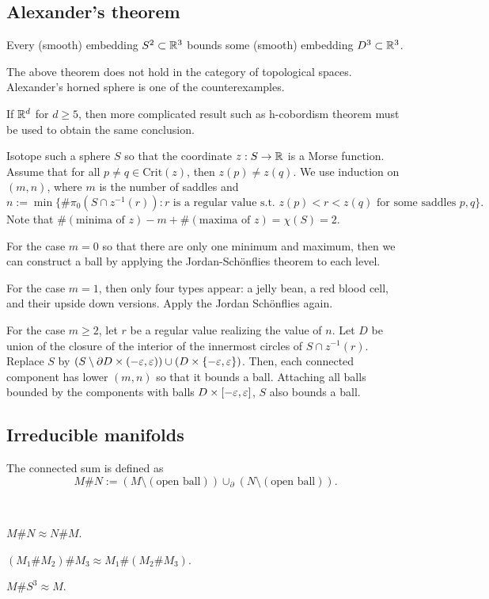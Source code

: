 \documentclass{../../small}
\begin{document}
\subsection{Alexander's theorem}
\begin{thm}
Every (smooth) embedding $S^2\subset\mathbb{R}^3$ bounds some (smooth) embedding $D^3\subset\mathbb{R}^3$.
\end{thm}
\begin{rmk*}
The above theorem does not hold in the category of topological spaces.
Alexander's horned sphere is one of the counterexamples.

If $\mathbb{R}^d$ for $d\ge5$, then more complicated result such as h-cobordism theorem must be used to obtain the same conclusion.
\end{rmk*}
\begin{pf}[Sketch]
Isotope such a sphere $S$ so that the coordinate $z:S\to\mathbb{R}$ is a Morse function.
Assume that for all $p\ne q\in\mathrm{Crit}(z)$, then $z(p)\ne z(q)$.
We use induction on $(m,n)$, where $m$ is the number of saddles and
\[n:=\min\{\#\pi_0(S\cap z^{-1}(r)):\text{$r$ is a regular value s.t. $z(p)<r<z(q)$ for some saddles $p,q$}\}.\]
Note that $\#(\text{minima of $z$})-m+\#(\text{maxima of $z$})=\chi(S)=2$.

For the case $m=0$ so that there are only one minimum and maximum, then we can construct a ball by applying the Jordan-Sch\"onflies theorem to each level.

For the case $m=1$, then only four types appear: a jelly bean, a red blood cell, and their upside down versions.
Apply the Jordan Sch\"onflies again.

For the case $m\ge2$, let $r$ be a regular value realizing the value of $n$.
Let $D$ be union of the closure of the interior of the innermost circles of $S\cap z^{-1}(r)$.
Replace $S$ by $(S\setminus\pd D\times(-\e,\e))\cup(D\times\{-\e,\e\})$.
Then, each connected component has lower $(m,n)$ so that it bounds a ball.
Attaching all balls bounded by the components with balls $D\times[-\varepsilon,\varepsilon]$, $S$ also bounds a ball.
\end{pf}

\subsection{Irreducible manifolds}

The connected sum is defined as
\[M\# N:=(M\setminus(\text{open ball}))\cup_\partial(N\setminus(\text{open ball})).\]
\begin{prop}\,
\begin{parts}
\item $M\# N\approx N\# M$.
\item $(M_1\# M_2)\# M_3\approx M_1\#(M_2\# M_3)$.
\item $M\# S^3\approx M$.
\end{parts}
\end{prop}
\end{document}
